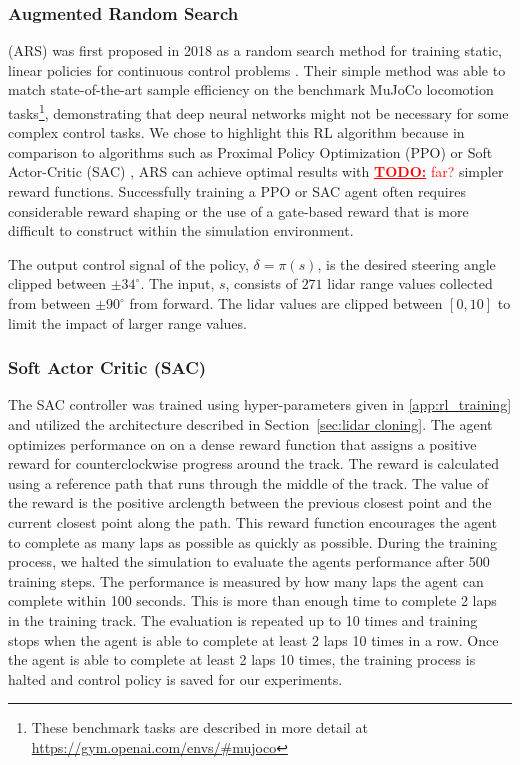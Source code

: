 \documentclass[manuscript,screen,review]{acmart}
\newcommand{\todo}[1]{\textcolor{red}{\textbf{\underline{TODO:}} #1}}
\begin{document}
\subsubsection{Augmented Random Search} 
(ARS) was first proposed in 2018 as a random search method for training static, linear policies for continuous control problems \cite{mania2018simple}. Their simple method was able to match state-of-the-art sample efficiency on the benchmark MuJoCo locomotion tasks\footnote{These benchmark tasks are described in more detail at \url{https://gym.openai.com/envs/\#mujoco}}, demonstrating that deep neural networks might not be necessary for some complex control tasks. We chose to highlight this RL algorithm because in comparison to algorithms such as Proximal Policy Optimization (PPO) \cite{schulman2017proximal} or Soft Actor-Critic (SAC) \cite{haarnoja2018soft}, ARS can achieve optimal results with \todo{far?} simpler reward functions. Successfully training a PPO or SAC agent often requires considerable reward shaping or the use of a gate-based reward that is more difficult to construct within the simulation environment.

The output control signal of the policy, $\delta = \pi(s)$, is the desired steering angle clipped between $\pm 34^{\circ}$. The input, $s$, consists of $271$ lidar range values collected from between $\pm90^{\circ}$ from forward. The lidar values are clipped between $[0, 10]$ to limit the impact of larger range values.

\subsubsection{Soft Actor Critic (SAC)}
The SAC controller was trained using hyper-parameters given in  \ref{app:rl_training} and utilized the architecture described in Section~\ref{sec:lidar cloning}. The agent optimizes performance on on a dense reward function that assigns a positive reward for counterclockwise progress around the track. The reward is calculated using a reference path that runs through the middle of the track. The value of the reward is the positive arclength between the previous closest point and the current closest point along the path. This reward function encourages the agent to complete as many laps as possible as quickly as possible. During the training process, we halted the simulation to evaluate the agents performance after 500 training steps. The performance is measured by how many laps the agent can complete within 100 seconds. This is more than enough time to complete 2 laps in the training track. The evaluation is repeated up to 10 times and training stops when the agent is able to complete at least 2 laps 10 times in a row. Once the agent is able to complete at least 2 laps 10 times, the training process is halted and control policy is saved for our experiments.
\end{document}

